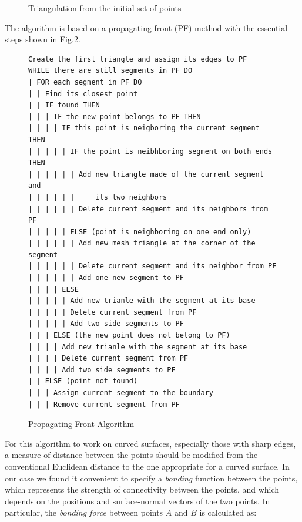 \documentclass[12pt]{article}
\begin{document}
\begin{figure}
\center
{}
\caption{\label{mesh}Triangulation from the initial set of points}
\end{figure}

The algorithm is based on a propagating-front (PF) method \cite{AkGlCGD2001,OsJCP1988}
with the essential steps shown in Fig.\ref{alg}.

\begin{figure}
\begin{verbatim}
Create the first triangle and assign its edges to PF
WHILE there are still segments in PF DO
| FOR each segment in PF DO
| | Find its closest point
| | IF found THEN
| | | IF the new point belongs to PF THEN
| | | | IF this point is neigboring the current segment THEN
| | | | | IF the point is neibhboring segment on both ends THEN
| | | | | | Add new triangle made of the current segment and 
| | | | | |     its two neighbors
| | | | | | Delete current segment and its neighbors from PF
| | | | | ELSE (point is neighboring on one end only)
| | | | | | Add new mesh triangle at the corner of the segment
| | | | | | Delete current segment and its neighbor from PF
| | | | | | Add one new segment to PF
| | | | ELSE
| | | | | Add new trianle with the segment at its base 
| | | | | Delete current segment from PF
| | | | | Add two side segments to PF
| | | ELSE (the new point does not belong to PF)
| | | | Add new trianle with the segment at its base 
| | | | Delete current segment from PF
| | | | Add two side segments to PF
| | ELSE (point not found)
| | | Assign current segment to the boundary 
| | | Remove current segment from PF
\end{verbatim}
\caption{\label{alg}Propagating Front Algorithm}
\end{figure}

For this algorithm to work on curved surfaces, especially those with sharp
edges, a measure of distance between the points should be modified from the
conventional Euclidean distance to the one appropriate for a curved surface. In
our case we found it convenient to specify a {\em bonding} function between the
points, which represents the strength of connectivity between the points, and
which depends on the positions and surface-normal vectors of the two points. In
particular, the {\em bonding force} between points $A$ and $B$ is calculated
as:
\end{document}
